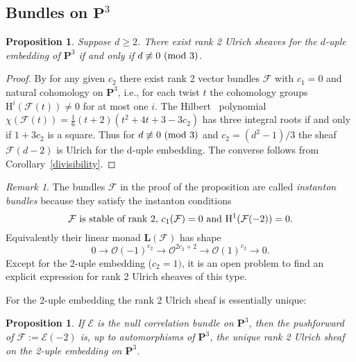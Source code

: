 \documentclass{jams-l}
\newtheorem{proposition}[theorem]{Proposition}
\theoremstyle{definition}
\theoremstyle{remark}
\newtheorem*{remark}{Remark}
\newcommand{\E} {{\mathcal E}}
\newcommand{\F}{{\mathcal F}}
\newcommand{\Hrm}{{\mathrm H}}
\newcommand{\LL}{{\mathbf L}}
\newcommand{\Ocal}{{\mathcal O}}
\newcommand{\PP}{{\mathbf P}}
\newcommand{\rTox}{\rightarrow}
\begin{document}
\subsection*{Bundles on ${\mathbf P}^3$}

\begin{proposition}\label{Instanton bundles} Suppose $d\geq 2$.
There exist rank 2 Ulrich sheaves
for the $d$-uple embedding of $\PP^3$ if and only if 
$d \not\equiv 0\  ({\rm mod}\ 3)$.
\end{proposition}

\begin{proof}
By \cite{Hartshorne and Hirschowitz 1982}  for any given $c_2$ there exist
rank 2 vector bundles $\F$ with $c_1=0$ 
and natural cohomology on $\PP^3$, i.e., for each twist $t$ the cohomology
groups  $\Hrm^i(\F(t))\not=0 $ for at most one $i$. The Hilbert
\pagebreak \ polynomial $\chi(\F(t))=\frac{1}{6}(t+2)(t^2+4t+3-3c_2)$ has three
integral roots if and only if $1+3c_2$ is a square. Thus for
$d \not\equiv 0\ ({\rm mod}\ 3)$  and
$c_2=(d^2-1)/3$ the sheaf $\F(d-2)$ is Ulrich for the d-uple embedding.
The converse follows from Corollary~\ref{divisibility}.
\end{proof}

\begin{remark} The bundles $\F$ in the proof of the proposition
 are  called {\it instanton bundles\/} \cite{Tikhomirov 1997}
because they satisfy the instanton conditions
\[ 
\F \hbox{ is stable of rank } 2,\, c_1(\F)=0 \hbox{ and } \Hrm^1(\F(-2))=0.
\] 
Equivalently their linear monad $\LL(\F)$ has shape
\[ 0 \rTox \Ocal(-1)^{c_2} \rTox \Ocal^{2c_2+2} \rTox \Ocal(1)^{c_2} \rTox 0.\]
Except for the 2-uple embedding ($c_2=1)$,
it is an open problem  to find an explicit expression for
rank 2 Ulrich sheaves of this type. 
\end{remark}

For the 2-uple embedding the rank 2 Ulrich sheaf is essentially unique:

\begin{proposition}\label{2-uple on P3} 
If $\E$ is the null correlation bundle on $\PP^3$,
then the pushforward of $\F:=\E(-2)$ is,
up to automorphisms of $\PP^3$, the unique
rank 2 Ulrich sheaf on the 2-uple embedding on $\PP^3$.
\end{proposition}
\end{document}
